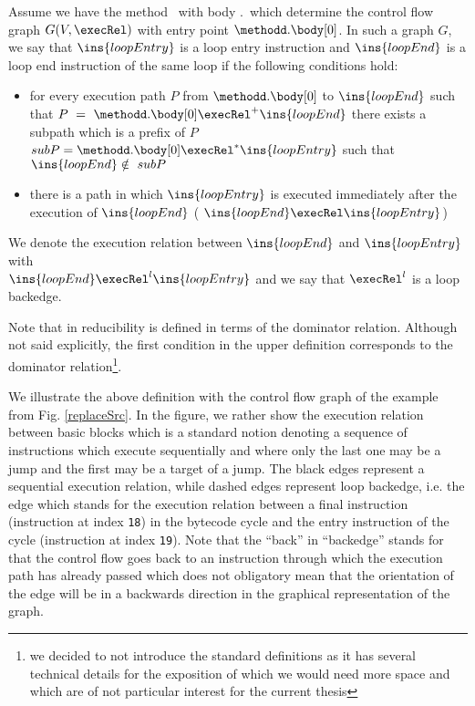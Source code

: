\begin{defLoop}
\label{defLoop}
Assume we have the method \methodd \ with body \methodd.\body \ which determine the control flow graph $G(V, \execRel) $
with entry point $\methodd.\body[0]$.
 In such a graph $G$, we say that $\ins{loopEntry}$ is a loop entry instruction and $\ins{loopEnd}$ is a loop end instruction
 of the same loop if the following conditions hold:
\begin{itemize}
\item for every execution path $P$ from $\methodd.\body[0]$ to  $\ins{loopEnd}$ such that
     $P~=~\methodd.\body[0] \execRel^{+} \ins{loopEnd}$
     there exists a subpath which is a prefix of $P$  $subP = \methodd.\body[0] \execRel^{*} \ins{loopEntry}$ such that $\ins{loopEnd} \notin  \ subP  $
\item there is a path in which $\ins{loopEntry}$  is executed immediately after the execution of $\ins{loopEnd}$ ( $\ins{loopEnd} \execRel \ins{loopEntry}$)
\end{itemize}
We denote the execution relation between $\ins{loopEnd}$ and  $\ins{loopEntry}$ with \\
$\ins{loopEnd} \execRel^l \ins{loopEntry}$ and we say that $  \execRel^l $  is a loop backedge. 
\end{defLoop}
Note  that  in  \cite{ARUCom1986}  reducibility is defined in terms of the dominator relation. 
Although  not said explicitly, the first condition in the upper definition corresponds to the dominator relation\footnote{we decided to not introduce the standard
definitions as it has several technical details for the exposition of which we would need more space and which are of not particular interest for the current thesis}.

We illustrate the above definition with the control flow graph of the example from Fig. \ref{replaceSrc}.%
In the figure, we rather show the execution relation between basic blocks which is a standard notion denoting a sequence of instructions which execute sequentially
and  where only the last one may be a jump and the first may be a target of a jump. 
The black edges represent a sequential execution relation, while dashed edges represent  loop backedge, i.e. the edge which stands for the execution
relation between a final instruction (instruction at index \texttt{18}) in the bytecode cycle and the entry instruction of the cycle (instruction at index \texttt{19}).  
Note that the ``back'' in ``backedge'' stands for  that the control flow goes back to an instruction through which 
the execution path has already passed which does not obligatory mean that the orientation of the edge will be in a backwards direction in the graphical representation 
of the graph. 

